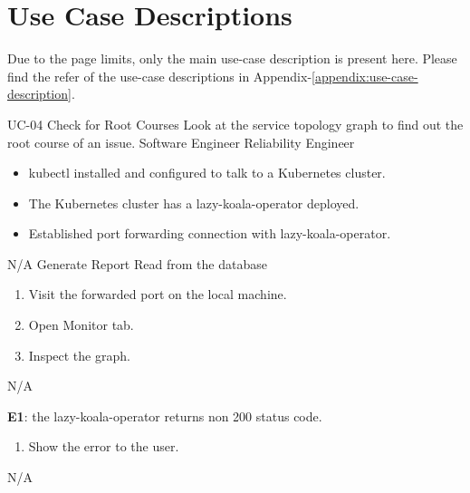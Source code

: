 \newenvironment{CompactItemizes}
{ \vspace{-8mm}\begin{itemize}[leftmargin=*,noitemsep,nolistsep]}
{ \vspace{-7mm}\end{itemize}} 

\newenvironment{CompactEnumerate}
{ \vspace{-8mm}\begin{enumerate}[leftmargin=*,noitemsep,nolistsep]}
{ \vspace{-7mm}\end{enumerate}} 


\section{Use Case Descriptions}
Due to the page limits, only the main use-case description is present here. Please find the refer  of the use-case descriptions in Appendix-\ref{appendix:use-case-description}.

\vspace{-2em}
\UseCaseDescription
{UC-04}
{Check for Root Courses}
{Look at the service topology graph to find out the root course of an issue.}
{Software Engineer\newline
Reliability Engineer}
{\begin{CompactItemizes}
    \item kubectl installed and configured to talk to a Kubernetes cluster.
    \item The Kubernetes cluster has a \ac{lazy-koala-operator} deployed.
    \item Established port forwarding connection with \ac{lazy-koala-operator}.
\end{CompactItemizes}}
{N/A}
{Generate Report\newline
Read from the database}
{\begin{CompactEnumerate}
    \item Visit the forwarded port on the local machine.
    \item Open Monitor tab.
    \item Inspect the graph.
\end{CompactEnumerate}}
{{N/A}
{\textbf{E1}: the \ac{lazy-koala-operator} returns non 200 status code.
\vspace{-4mm}\begin{enumerate}
    \item Show the error to the user.
\vspace{-7mm}\end{enumerate}}
{N/A}}


